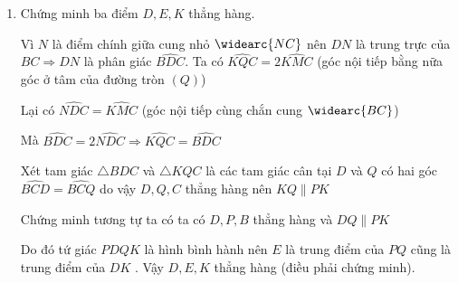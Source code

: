 \begin{ex}
{{\begin{enumerate}
    		  $ \Rightarrow \widehat{ABC}=\widehat{AHI}$ mà hai góc này ở vị trí đồng vị nên $BK \parallel HI  \ (2)$
    		  
    		  Từ $(1)$ và $(2)$  suy ra tứ giác $BHIK$ là hình bình hành.
    		  
    		  Mặt khác $AN, CM$ lần lượt là các tia phân giác của các góc $A$ và $C$ trong tam giác $ABC$
    		  nên $I$ là giao điểm ba đường phån giác, do đó $BI$ là tia phân giác của góc $B$.
    		  
    		  Vậy tứ giác $BHIK$ là hình thoi ( dấu hiệu nhận biết hình thoi). 
    		  
    		  \item Chứng minh
    		  ba điểm $D,E,K$ thẳng hàng.
    		  
    		  Vì $N$ là điểm chính giữa cung nhỏ $\widearc{NC}$ nên $DN$ là trung trực của $BC \Rightarrow DN$ là phân giác $\widehat{BDC}.$ Ta có $\widehat{KQC}=2\widehat{KMC}$ (góc nội tiếp bằng nữa góc ở tâm  của đường tròn $(Q)$)
    		  
    		  Lại có $\widehat{NDC}=\widehat{KMC}$ (góc nội tiếp cùng chắn cung $\widearc{BC}$)
    		  
    		  Mà $\widehat{BDC}=2\widehat{NDC} \Rightarrow \widehat{KQC}=\widehat{BDC}$
    		  
    		  Xét tam giác $\bigtriangleup BDC$ và $\bigtriangleup KQC $
 là các tam giác cân tại $D$ và $Q$ có hai góc $\widehat{BCD}=\widehat{BCQ}$ do vậy $D,Q,C$ thẳng hàng nên $KQ \parallel PK$

Chứng minh tương tự ta có ta có $D,P,B$ thẳng hàng và $ DQ\parallel PK$


Do đó tứ giác $PDQK$ là hình bình hành nên $E$ là trung điểm của $PQ$ cũng là trung điểm
của $DK$ . Vậy $D,E,K$ thẳng hàng (điều phải chứng minh).
    	     \end{enumerate}}
         
         
}
\end{ex}



